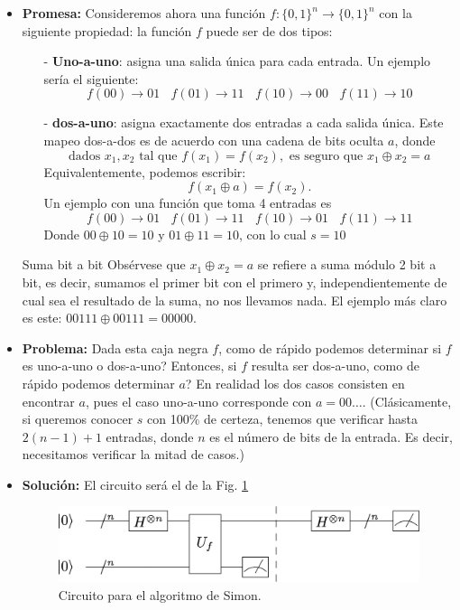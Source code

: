 \documentclass[a4paper,11pt]{book} %
\numberwithin{equation}{chapter}
\begin{document}
\begin{itemize}
	\item \textbf{Promesa:} Consideremos ahora una función $f:\{0,1\}^n \to \{0,1\}^n$ con la siguiente propiedad: la función $f$ puede ser de dos tipos:
	\begin{itemize}
		\item[-] \textbf{Uno-a-uno}: asigna una salida única para cada entrada. Un ejemplo sería el siguiente:
		$$
		f(00) \rightarrow 01 ~~~~
		f(01) \rightarrow 11 ~~~~
		f(10) \rightarrow 00 ~~~~
		f(11) \rightarrow 10 
		$$
		\item[-] \textbf{dos-a-uno}: asigna exactamente dos entradas a cada salida única. Este mapeo dos-a-dos es de acuerdo con una cadena de bits oculta $a$, donde
		$$
		\text{dados } x_1, x_2 \text{ tal que } f(x_1) = f(x_2), \text{ es seguro que } x_1 \oplus x_2 = a
		$$
		Equivalentemente, podemos escribir: 
		$$ 
		f(x_1 \oplus a ) = f(x_2).
		$$
		Un ejemplo con una función que toma 4 entradas es
		$$
		f(00) \rightarrow 01 ~~~~
		f(01) \rightarrow 11 ~~~~
		f(10) \rightarrow 01 ~~~~
		f(11) \rightarrow 11 
		$$
		Donde $00 \oplus 10 =  10$ y $01 \oplus 11 = 10$, con lo cual $s =10$
	\end{itemize}
	
	\begin{mybox_blue}{Suma bit a bit}
	Obsérvese que $x_1 \oplus x_2 = a$ se refiere a suma módulo 2 bit a bit, es decir, sumamos el primer bit con el primero y, independientemente de cual sea el resultado de la suma, no nos llevamos nada. El ejemplo más claro es este: $00111 \oplus 00111 = 00000$.
	\end{mybox_blue}
	
	\item \textbf{Problema:} Dada esta caja negra $f$, como de rápido podemos determinar si $f$ es uno-a-uno o dos-a-uno? Entonces, si $f$ resulta ser dos-a-uno, como de rápido podemos determinar $a$? En realidad los dos casos consisten en encontrar $a$, pues el caso uno-a-uno corresponde con $a=00\dots$. (Clásicamente, si queremos conocer $s$ con 100\% de certeza, tenemos que verificar hasta $2(n-1) +1$ entradas, donde $n$ es el número de bits de la entrada. Es decir, necesitamos verificar la mitad de casos.)
		
	\item \textbf{Solución:} El circuito será el de la Fig. \ref{Fig_algoritmos_SimonCircuit}
	
		\begin{figure}[H]
			\centering 
			\includegraphics[width=0.6\linewidth]{Figuras/Fig_algoritmos_SimonCircuit.png}
			\caption{Circuito para el algoritmo de Simon.}
			\label{Fig_algoritmos_SimonCircuit}
			\end{figure}	
	

\end{itemize}
\end{document}
